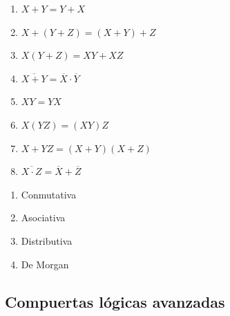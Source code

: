 \documentclass{templateNote}
\begin{document}
\noindent %
\begin{minipage}[t]{0.375\textwidth}
    \begin{enumerate}
        \item $X + Y = Y + X$
        \item $X + (Y + Z) = (X + Y) + Z$
        \item $X(Y + Z) = XY + XZ$
        \item $\overline{X + Y} = \overline{X} \cdot \overline{Y}$
    \end{enumerate}
\end{minipage}%
\begin{minipage}[t]{0.375\textwidth}
    \begin{enumerate}
        \setcounter{enumi}{4} %
        \item $XY = YX$
        \item $X(YZ) = (XY)Z$
        \item $X + YZ = (X + Y)(X + Z)$
        \item $\overline{X \cdot Z} = \overline{X} + \overline{Z}$
    \end{enumerate}
\end{minipage}%
\begin{minipage}[t]{0.25\textwidth}
    \begin{enumerate}[label={}]
        \item Conmutativa
        \item Asociativa
        \item Distributiva
        \item De Morgan
    \end{enumerate}
\end{minipage}

\subsection{Compuertas lógicas avanzadas}
\end{document}

